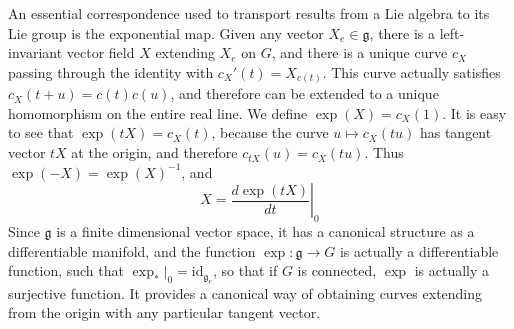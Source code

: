 An essential correspondence used to transport results from a Lie algebra to its Lie group is the exponential map. Given any vector $X_e \in \mathfrak{g}$, there is a left-invariant vector field $X$ extending $X_e$ on $G$, and there is a unique curve $c_X$ passing through the identity with $c_X'(t) = X_{c(t)}$. This curve actually satisfies $c_X(t + u) = c(t) c(u)$, and therefore can be extended to a unique homomorphism on the entire real line. We define $\exp(X) = c_X(1)$. It is easy to see that $\exp(tX) = c_X(t)$, because the curve $u \mapsto c_X(tu)$ has tangent vector $tX$ at the origin, and therefore $c_{tX}(u) = c_X(tu)$. Thus $\exp(-X) = \exp(X)^{-1}$, and
%
\[ X = \left. \frac{d\exp(tX)}{dt} \right|_0 \]
%
Since $\mathfrak{g}$ is a finite dimensional vector space, it has a canonical structure as a differentiable manifold, and the function $\exp: \mathfrak{g} \to G$ is actually a differentiable function, such that $\exp_* |_0 = \text{id}_{\mathfrak{g}_e}$, so that if $G$ is connected, $\exp$ is actually a surjective function. It provides a canonical way of obtaining curves extending from the origin with any particular tangent vector.